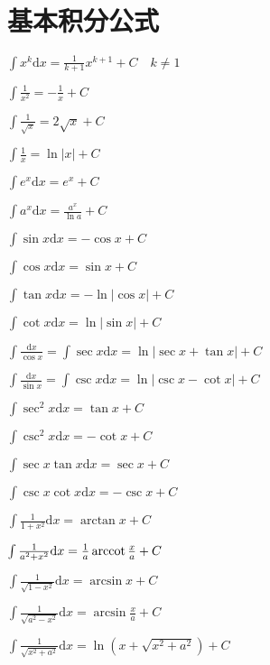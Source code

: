 \section{基本积分公式}

\begin{multicols}{2}
    \begin{spacing}{\hangju}
        \noindent $\int{x^k}\mathrm{d}x = \frac{1}{k+1}x^{k+1} + C \quad k\neq1$

        \noindent $\int{\frac{1}{x^2}} = -\frac{1}{x} + C$

        \noindent $\int{\frac{1}{\sqrt{x}}} = 2\sqrt{x} + C$

        \noindent $\int{\frac{1}{x}} = \ln{\left| x \right|} + C$

        \noindent $\int{e^x}\mathrm{d}x = e^x + C$

        \noindent $\int{a^x}\mathrm{d}x = \frac{a^x}{\ln{a}} + C$

        \noindent $\int{\sin{x}}\mathrm{d}x = -\cos{x} + C$

        \noindent $\int{\cos{x}}\mathrm{d}x = \sin{x} + C$

        \noindent $\int{\tan{x}}\mathrm{d}x = -\ln{\left| \cos{x} \right|} + C$

        \noindent $\int{\cot{x}}\mathrm{d}x = \ln{\left| \sin{x} \right|} + C$
    \end{spacing}
\end{multicols}

\noindent $\int{\frac{\mathrm{d}x}{\cos{x}}} = \int{\sec{x}}\mathrm{d}x = \ln{\left| \sec{x} + \tan{x} \right| } + C$

\noindent $\int{\frac{\mathrm{d}x}{\sin{x}}} = \int{\csc{x}}\mathrm{d}x = \ln{\left| \csc{x} - \cot{x} \right| } + C$

\begin{multicols}{2}
    \begin{spacing}{\hangju}
        \noindent $\int{\sec^2{x}}\mathrm{d}x = \tan{x} + C$

        \noindent $\int{\csc^2{x}}\mathrm{d}x = -\cot{x} + C$

        \noindent $\int{\sec{x}\tan{x}}\mathrm{d}x = \sec{x} + C$

        \noindent $\int{\csc{x}\cot{x}}\mathrm{d}x = -\csc{x} + C$

        \noindent $\int{\frac{1}{1 + x^2}}\mathrm{d}x = \arctan{x} + C$

        \noindent $\int{\frac{1}{a^2 + x^2}}\mathrm{d}x = \frac{1}{a}\operatorname{arccot}{\frac{x}{a}} + C$

        \noindent $\int{\frac{1}{\sqrt{1 - x^2}}}\mathrm{d}x = \arcsin{x} + C$

        \noindent $\int{\frac{1}{\sqrt{a^2 - x^2}}}\mathrm{d}x = \arcsin{\frac{x}{a}} + C$
    \end{spacing}
\end{multicols}
\noindent $\int{\frac{1}{\sqrt{x^2 + a^2}}}\mathrm{d}x = \ln{(x + \sqrt{x^2 + a ^2})} + C$

